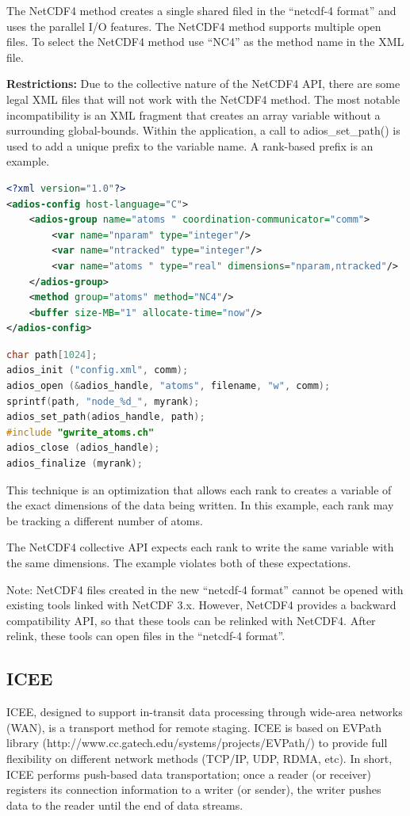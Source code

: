 The NetCDF4 method creates a single shared filed in the ``netcdf-4 format'' and 
uses the parallel I/O features.  The NetCDF4 method supports multiple open files. 
 To select the NetCDF4 method use ``NC4'' as the method name in the XML file.

\textbf{Restrictions:} Due to the collective nature of the NetCDF4 API, there are 
some legal XML files that will not work with the NetCDF4 method.  The most notable 
incompatibility is an XML fragment that creates an array variable without a surrounding 
global-bounds.  Within the application, a call to adios\_set\_path() is used to 
add a unique prefix to the variable name.  A rank-based prefix is an example. 

\begin{lstlisting}[language=XML, caption=Example XML]
<?xml version="1.0"?> 
<adios-config host-language="C">
	<adios-group name="atoms " coordination-communicator="comm"> 
		<var name="nparam" type="integer"/>
		<var name="ntracked" type="integer"/>
		<var name="atoms " type="real" dimensions="nparam,ntracked"/> 
	</adios-group>
	<method group="atoms" method="NC4"/> 
	<buffer size-MB="1" allocate-time="now"/> 
</adios-config>
\end{lstlisting}

\begin{lstlisting}[language=C, caption=Example C source]
char path[1024];
adios_init ("config.xml", comm);
adios_open (&adios_handle, "atoms", filename, "w", comm); 
sprintf(path, "node_%d_", myrank); 
adios_set_path(adios_handle, path);
#include "gwrite_atoms.ch" 
adios_close (adios_handle); 
adios_finalize (myrank);
\end{lstlisting}

This technique is an optimization that allows each rank to creates a variable of 
the exact dimensions of the data being written.  In this example, each rank may 
be tracking a different number of atoms.

The NetCDF4 collective API expects each rank to write the same variable with the 
same dimensions.  The example violates both of these expectations.

Note: NetCDF4 files created in the new ``netcdf-4 format'' cannot be opened with 
existing tools linked with NetCDF 3.x.  However, NetCDF4 provides a backward compatibility 
API, so that these tools can be relinked with NetCDF4.  After relink, these tools 
can open files in the ``netcdf-4 format''.

\subsection{ICEE}
ICEE, designed to support in-transit data processing through wide-area networks (WAN), is a transport method for remote staging. ICEE is based on EVPath library (http://www.cc.gatech.edu/systems/projects/EVPath/) to provide full flexibility on different network methods (TCP/IP, UDP, RDMA, etc). In short, ICEE performs push-based data transportation; once a reader (or receiver) registers its connection information to a writer (or sender), the writer pushes data to the reader until the end of data streams.

